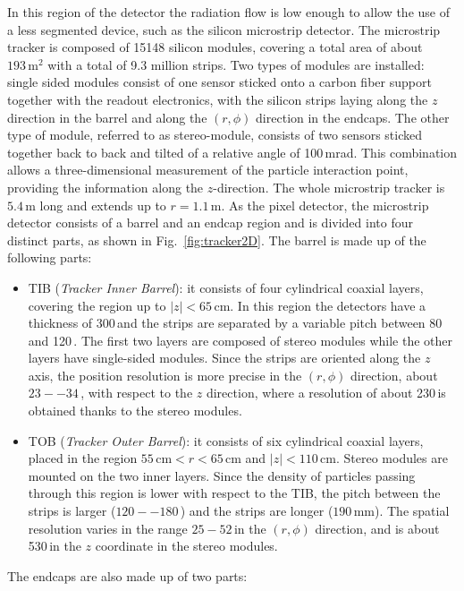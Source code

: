 In this region of the detector the radiation flow is low enough to allow the use of a less segmented device, such as the silicon microstrip detector.
The microstrip tracker is composed of 15148 silicon modules, covering a total area of about $193\,\mathrm{m^2}$ with a total of 9.3 million strips. Two types of modules are installed: single sided modules consist of one sensor sticked onto a carbon fiber support together with the readout electronics, with the silicon strips laying along the $z$ direction in the barrel and along the $(r,\phi)$ direction in the endcaps. The other type of module, referred to as stereo-module, consists of two sensors sticked together back to back and tilted of a relative angle of 100\,mrad. This combination allows a three-dimensional measurement of the particle interaction point, providing the information along the $z$-direction. The whole microstrip tracker is $5.4$\,m long and extends up to $r=1.1$\,m. As the pixel detector, the microstrip detector consists of a barrel and an endcap region and is divided into four distinct parts, as shown in Fig.~\ref{fig:tracker2D}. The barrel is made up of the following parts:
\begin{itemize}
\item TIB (\emph{Tracker Inner Barrel}): it consists of four cylindrical coaxial layers, covering the region up to $|z|<65$\,cm. In this region the detectors have a thickness of 300\,\micron and the strips are separated by a variable pitch between 80 and 120\,\micron. The first two layers are composed of stereo modules while the other layers have single-sided modules. Since the strips are oriented along the $z$ axis, the position resolution is more precise in the $(r,\phi)$ direction, about $23 -- 34$\,\micron, with respect to the $z$ direction, where a resolution of about 230\,\micron is obtained thanks to the stereo modules.
\item TOB (\emph{Tracker Outer Barrel}): it consists of six cylindrical coaxial layers, placed in the region $55\,\mathrm{cm} < r < 65\,\mathrm{cm}$ and $|z|<110$\,cm. Stereo modules are mounted on the two inner layers. Since the density of particles passing through this region is lower with respect to the TIB, the pitch between the strips is larger ($120 -- 180$\,\micron) and the strips are longer ($190$\,mm). The spatial resolution varies in the range $25 - 52$\,\micron in the $(r,\phi)$ direction, and is about 530\,\micron in the $z$ coordinate in the stereo modules.
\end{itemize}
The endcaps are also made up of two parts:
